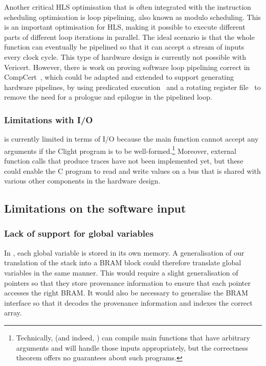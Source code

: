 Another critical \gls{HLS} optimisation that is often integrated with the
instruction scheduling optimisation is loop pipelining, also known as modulo
scheduling.  This is an important optimisation for \gls{HLS}, making it possible
to execute different parts of different loop iterations in parallel.  The ideal
scenario is that the whole function can eventually be pipelined so that it can
accept a stream of inputs every clock cycle.  This type of hardware design is
currently not possible with Vericert.  However, there is work on proving
software loop pipelining correct in
CompCert~\cite{tristan10_simpl_verif_valid_softw_pipel}, which could be adapted
and extended to support generating hardware pipelines, by using predicated
execution~\cite{rau92_code_gener_schem_sched_loops} and a rotating register
file~\cite{rau92_regis_alloc_softw_pipel_loops} to remove the need for a
prologue and epilogue in the pipelined loop.

\subsubsection{Limitations with I/O}

\vericert{} is currently limited in terms of I/O because the main function
cannot accept any arguments if the Clight program is to be
well-formed.\footnote{Technically, \vericert{} (and indeed, \compcert{}) can
  compile main functions that have arbitrary arguments and will handle those
  inputs appropriately, but the correctness theorem offers no guarantees about
  such programs.} Moreover, external function calls that produce traces have not
been implemented yet, but these could enable the C program to read and write
values on a bus that is shared with various other components in the hardware
design.

\subsection{Limitations on the software input}

\subsubsection{Lack of support for global variables}

In \compcert{}, each global variable is stored in its own memory.  A
generalisation of our translation of the stack into a \gls{BRAM} block could
therefore translate global variables in the same manner.  This would require a
slight generalisation of pointers so that they store provenance information to
ensure that each pointer accesses the right \gls{BRAM}. It would also be
necessary to generalise the \gls{BRAM} interface so that it decodes the
provenance information and indexes the correct array.

